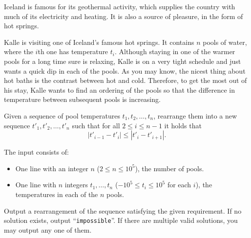 \providecommand{\maxn}{}
\renewcommand{\maxn}{10^5}
\providecommand{\maxa}{}
\renewcommand{\maxa}{10^5}

%
Iceland is famous for its geothermal activity, which supplies the country with much of its
electricity and heating. It is also a source of pleasure, in the form of hot springs.

Kalle is visiting one of Iceland's famous hot springs. It contains $n$ pools of water, 
where the $i$th one has temperature $t_i$. Although staying in one of the warmer pools 
for a long time sure is relaxing, Kalle is on a very tight schedule and just wants a quick
dip in each of the pools. As you may know, the nicest thing about hot baths is the contrast
between hot and cold. Therefore, to get the most out of his stay, Kalle wants to find an ordering
of the pools so that the difference in temperature between subsequent pools is increasing.

Given a sequence of pool temperatures $t_1, t_2, \dots, t_n$, rearrange them into a new sequence
$t'_1, t'_2, \dots, t'_n$ such that for all $2 \leq i \leq n-1$ it holds that
\[
    |t'_{i-1} - t'_i| \leq |t'_i - t'_{i+1}|.
\]

\begin{Input}
The input consists of:

\begin{itemize}
\item One line with an integer $n$ ($2 \le n \leq  10^5$), the number of pools.
\item One line with $n$ integers $t_1, \ldots, t_n$ ($-\maxa \leq t_i \leq \maxa$ for each $i$), the
    temperatures in each of the $n$ pools.
\end{itemize}

\end{Input}

\begin{Output}
Output a rearrangement of the sequence satisfying the given requirement.
If no solution exists, output ``\texttt{impossible}''. If there are multiple
valid solutions, you may output any one of them.
\end{Output}

